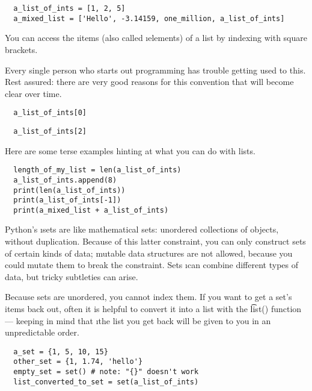 \documentclass[letterpaper, 12pt, titlepage, twoside]{article}
\begin{document}
\begin{lstlisting}
  a_list_of_ints = [1, 2, 5]
  a_mixed_list = ['Hello', -3.14159, one_million, a_list_of_ints]
\end{lstlisting}

You can access the \i{items} (also called \i{elements}) of a list by
\i{indexing} with square brackets.

\medskip
\begin{center}
\end{center}
\medskip

Every single person who starts out programming has trouble getting used to
this. Rest assured: there are very good reasons for this convention that will
become clear over time.

\begin{lstlisting}
  a_list_of_ints[0]
\end{lstlisting}

\begin{lstlisting}
  a_list_of_ints[2]
\end{lstlisting}

Here are some terse examples hinting at what you can do with lists.

\begin{lstlisting}
  length_of_my_list = len(a_list_of_ints)
  a_list_of_ints.append(8)
  print(len(a_list_of_ints))
  print(a_list_of_ints[-1])
  print(a_mixed_list + a_list_of_ints)
\end{lstlisting}

Python's \i{sets} are like mathematical sets: unordered collections of
objects, without duplication. Because of this latter constraint, you can only
construct sets of certain kinds of data; mutable data structures are not
allowed, because you could mutate them to break the constraint. Sets \i{can}
combine different types of data, but tricky subtleties can arise.

Because sets are unordered, you cannot index them. If you want to get a set's
items back out, often it is helpful to convert it into a list with the
\t{list()} function --- keeping in mind that \i{the list you get back will be
  given to you in an unpredictable order}.

\begin{lstlisting}
  a_set = {1, 5, 10, 15}
  other_set = {1, 1.74, 'hello'}
  empty_set = set() # note: "{}" doesn't work
  list_converted_to_set = set(a_list_of_ints)
\end{lstlisting}
\end{document}
